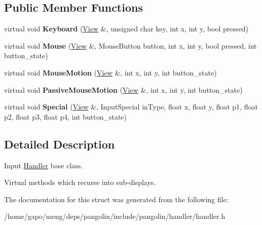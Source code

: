 \subsection*{Public Member Functions}
\begin{DoxyCompactItemize}
\item 
virtual void {\bfseries Keyboard} (\hyperlink{structpangolin_1_1_view}{View} \&, unsigned char key, int x, int y, bool pressed)\hypertarget{structpangolin_1_1_handler_aa777762ec9ea10276aa030cf6624787e}{}\label{structpangolin_1_1_handler_aa777762ec9ea10276aa030cf6624787e}

\item 
virtual void {\bfseries Mouse} (\hyperlink{structpangolin_1_1_view}{View} \&, Mouse\+Button button, int x, int y, bool pressed, int button\+\_\+state)\hypertarget{structpangolin_1_1_handler_a85b0aa1571091ec54c44a4f59672c4c5}{}\label{structpangolin_1_1_handler_a85b0aa1571091ec54c44a4f59672c4c5}

\item 
virtual void {\bfseries Mouse\+Motion} (\hyperlink{structpangolin_1_1_view}{View} \&, int x, int y, int button\+\_\+state)\hypertarget{structpangolin_1_1_handler_aae505284ea5430cd58b65e350b48b772}{}\label{structpangolin_1_1_handler_aae505284ea5430cd58b65e350b48b772}

\item 
virtual void {\bfseries Passive\+Mouse\+Motion} (\hyperlink{structpangolin_1_1_view}{View} \&, int x, int y, int button\+\_\+state)\hypertarget{structpangolin_1_1_handler_aa4494db317ea8c813d2ca33c430acb4c}{}\label{structpangolin_1_1_handler_aa4494db317ea8c813d2ca33c430acb4c}

\item 
virtual void {\bfseries Special} (\hyperlink{structpangolin_1_1_view}{View} \&, Input\+Special in\+Type, float x, float y, float p1, float p2, float p3, float p4, int button\+\_\+state)\hypertarget{structpangolin_1_1_handler_a3b8234114e97d07bf11b4833038b5f04}{}\label{structpangolin_1_1_handler_a3b8234114e97d07bf11b4833038b5f04}

\end{DoxyCompactItemize}


\subsection{Detailed Description}
Input \hyperlink{structpangolin_1_1_handler}{Handler} base class. 

Virtual methods which recurse into sub-\/displays. 

The documentation for this struct was generated from the following file\+:\begin{DoxyCompactItemize}
\item 
/home/gapo/meng/deps/pangolin/include/pangolin/handler/handler.\+h\end{DoxyCompactItemize}

